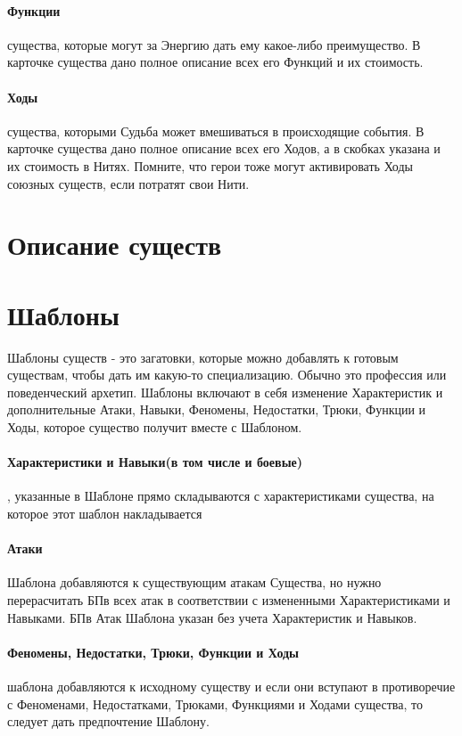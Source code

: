 \paragraph{Функции} существа, которые могут за Энергию дать ему какое-либо преимущество. В карточке существа дано полное описание всех его Функций и их стоимость.
\paragraph{Ходы} существа, которыми Судьба может вмешиваться в происходящие события. В карточке существа дано полное описание всех его Ходов, а в скобках указана и их стоимость в Нитях. Помните, что герои тоже могут активировать Ходы союзных существ, если потратят свои Нити.

\section{Описание существ}

\section{Шаблоны}
Шаблоны существ - это загатовки, которые можно добавлять к готовым существам, чтобы дать им какую-то специализацию. Обычно это профессия или поведенческий архетип.
\newline Шаблоны включают в себя изменение Характеристик и дополнительные Атаки, Навыки, Феномены, Недостатки, Трюки, Функции и Ходы, которое существо получит вместе с Шаблоном.
\paragraph{Характеристики и Навыки(в том числе и боевые)}, указанные в Шаблоне прямо складываются с характеристиками существа, на которое этот шаблон накладывается
\paragraph{Атаки} Шаблона добавляются к существующим атакам Существа, но нужно перерасчитать БПв всех атак в соответствии с измененными Характеристиками и Навыками. БПв Атак Шаблона указан без учета Характеристик и Навыков.
\paragraph{Феномены, Недостатки, Трюки, Функции и Ходы} шаблона добавляются к исходному существу и если они вступают в противоречие с Феноменами, Недостатками, Трюками, Функциями и Ходами существа, то следует дать предпочтение Шаблону.

